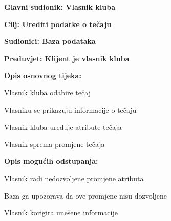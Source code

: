 						\noindent {}
						\begin{packed_item}
							
							\item \textbf{Glavni sudionik: Vlasnik kluba}
							\item  \textbf{Cilj: Urediti podatke o tečaju} 
							\item  \textbf{Sudionici: Baza podataka}
							\item  \textbf{Preduvjet: Klijent je vlasnik kluba}
							\item  \textbf{Opis osnovnog tijeka: }
							
							\item[] \begin{packed_enum}
								
								\item Vlasnik kluba odabire tečaj
								 \item Vlasniku se prikazuju informacije o tečaju
								\item Vlasnik kluba uređuje atribute tečaja
								\item Vlasnik sprema promjene tečaja
							\end{packed_enum}
							
							\item  \textbf{Opis mogućih odstupanja:}
							
							\item[] \begin{packed_item}
								
								\item[3.a] Vlasnik radi nedozvoljene promjene atributa
								\item[] \begin{packed_enum}
									
									\item Baza ga upozorava da ove promjene nisu dozvoljene
									\item Vlasnik korigira unešene informacije
									
								\end{packed_enum}
							
							\end{packed_item}
							
						\end{packed_item}
						
